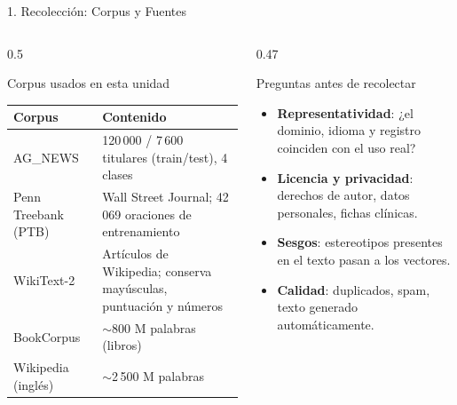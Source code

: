 \documentclass[aspectratio=169, 10pt]{beamer}
\begin{document}
\begin{frame}{1. Recolecci\'on: Corpus y Fuentes}

	\begin{columns}[T]
		\begin{column}{0.5\textwidth}
			\begin{block}{Corpus usados en esta unidad}
				\scriptsize
				\begin{tabular}{@{}lp{3.6cm}@{}}
					\toprule
					\textbf{Corpus} & \textbf{Contenido} \\
					\midrule
					AG\_NEWS & 120\,000 / 7\,600 titulares (train/test), 4 clases \\
					Penn Treebank (PTB) & Wall Street Journal; 42\,069 oraciones de entrenamiento \\
					WikiText-2 & Art\'iculos de Wikipedia; conserva may\'usculas, puntuaci\'on y n\'umeros \\
					BookCorpus & $\sim$800 M palabras (libros) \\
					Wikipedia (ingl\'es) & $\sim$2\,500 M palabras \\
					\bottomrule
				\end{tabular}
			\end{block}
		\end{column}

		\begin{column}{0.47\textwidth}
			\begin{block}{Preguntas antes de recolectar}
				\small
				\begin{itemize}
					\item \textbf{Representatividad}: ¿el dominio, idioma y registro coinciden con el uso real?
					\item \textbf{Licencia y privacidad}: derechos de autor, datos personales, fichas cl\'inicas.
					\item \textbf{Sesgos}: estereotipos presentes en el texto pasan a los vectores.
					\item \textbf{Calidad}: duplicados, spam, texto generado autom\'aticamente.
				\end{itemize}
			\end{block}
		\end{column}
	\end{columns}

\end{frame}
\end{document}
